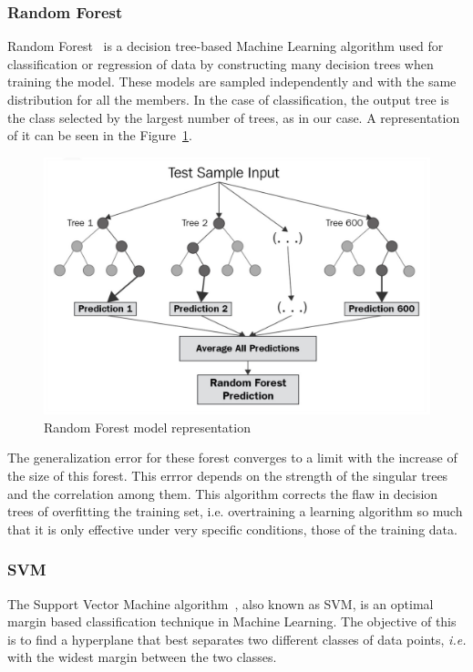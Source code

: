 \subsubsection{Random Forest}
Random Forest~\cite{breiman2001random} is a decision tree-based Machine Learning algorithm used for classification or regression of data by constructing many decision trees when training the model. These models are sampled independently and with the same distribution for all the members. In the case of classification, the output tree is the class selected by the largest number of trees, as in our case. A representation of it can be seen in the Figure~\ref{fig:random-forest}.

\begin{figure}[!htp]
    \centering
    \includegraphics[scale=0.3]{img/detection/random-forest.jpg}
    \caption{Random Forest model representation}
    \label{fig:random-forest}
\end{figure}

The generalization error for these forest converges to a limit with the increase of the size of this forest. This errror depends on the strength of the singular trees and the correlation among them. This algorithm corrects the flaw in decision trees of overfitting the training set, i.e. overtraining a learning algorithm so much that it is only effective under very specific conditions, those of the training data.

\subsubsection{SVM}
The Support Vector Machine algorithm~\cite{chauhan2019problem}, also known as SVM, is an optimal margin based classification technique in Machine Learning. The objective of this is to find a hyperplane that best separates two different classes of data points,\textit{ i.e.} with the widest margin between the two classes. 

